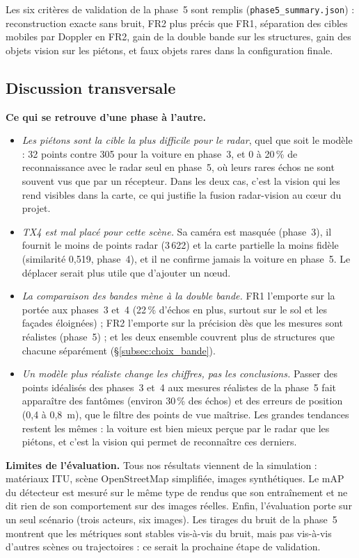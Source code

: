 \documentclass[12pt,a4paper,titlepage]{article}
\begin{document}
Les six critères de validation de la phase~5 sont remplis (\texttt{phase5\_summary.json}) : reconstruction exacte sans bruit, FR2 plus précis que FR1, séparation des cibles mobiles par Doppler en FR2, gain de la double bande sur les structures, gain des objets vision sur les piétons, et faux objets rares dans la configuration finale.

\subsection{Discussion transversale}
\label{subsec:discussion}

\textbf{Ce qui se retrouve d'une phase à l'autre.}
\begin{itemize}[leftmargin=1.5em]
    \item \emph{Les piétons sont la cible la plus difficile pour le radar}, quel que soit le modèle : 32 points contre 305 pour la voiture en phase~3, et 0 à 20\,\% de reconnaissance avec le radar seul en phase~5, où leurs rares échos ne sont souvent vus que par un récepteur. Dans les deux cas, c'est la vision qui les rend visibles dans la carte, ce qui justifie la fusion radar-vision au c\oe ur du projet.
    \item \emph{TX4 est mal placé pour cette scène.} Sa caméra est masquée (phase~3), il fournit le moins de points radar (3\,622) et la carte partielle la moins fidèle (similarité 0,519, phase~4), et il ne confirme jamais la voiture en phase~5. Le déplacer serait plus utile que d'ajouter un n\oe ud.
    \item \emph{La comparaison des bandes mène à la double bande.} FR1 l'emporte sur la portée aux phases~3 et~4 (22\,\% d'échos en plus, surtout sur le sol et les façades éloignées) ; FR2 l'emporte sur la précision dès que les mesures sont réalistes (phase~5) ; et les deux ensemble couvrent plus de structures que chacune séparément (\S\ref{subsec:choix_bande}).
    \item \emph{Un modèle plus réaliste change les chiffres, pas les conclusions.} Passer des points idéalisés des phases~3 et~4 aux mesures réalistes de la phase~5 fait apparaître des fantômes (environ 30\,\% des échos) et des erreurs de position (0,4 à 0,8~m), que le filtre des points de vue maîtrise. Les grandes tendances restent les mêmes : la voiture est bien mieux perçue par le radar que les piétons, et c'est la vision qui permet de reconnaître ces derniers.
\end{itemize}

\textbf{Limites de l'évaluation.} Tous nos résultats viennent de la simulation : matériaux ITU, scène OpenStreetMap simplifiée, images synthétiques. Le mAP du détecteur est mesuré sur le même type de rendus que son entraînement et ne dit rien de son comportement sur des images réelles. Enfin, l'évaluation porte sur un seul scénario (trois acteurs, six images). Les tirages du bruit de la phase~5 montrent que les métriques sont stables vis-à-vis du bruit, mais pas vis-à-vis d'autres scènes ou trajectoires : ce serait la prochaine étape de validation.
\end{document}
